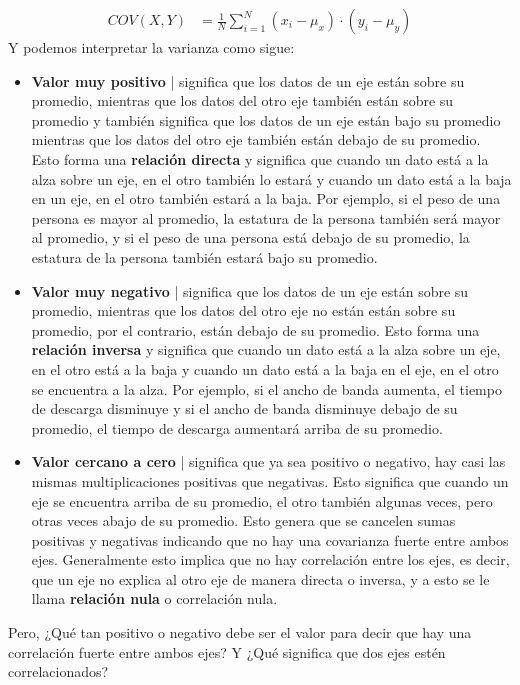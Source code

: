 \documentclass{article}
\begin{document}
\begin{equation}
    \begin{aligned}
        COV(X, Y) &= \frac{1}{N} \sum_{i=1}^{N} (x_i - \mu_x) \cdot (y_i - \mu_y)
    \end{aligned}
\end{equation}
Y podemos interpretar la varianza como sigue:
\begin{itemize}
    \item \textbf{Valor muy positivo} | significa que los datos de un eje están sobre su promedio, mientras que los datos del otro eje también están sobre su promedio y también significa que los datos de un eje están bajo su promedio mientras que los datos del otro eje también están debajo de su promedio. Esto forma una \textbf{relación directa} y significa que cuando un dato está a la alza sobre un eje, en el otro también lo estará y cuando un dato está a la baja en un eje, en el otro también estará a la baja. Por ejemplo, si el peso de una persona es mayor al promedio, la estatura de la persona también será mayor al promedio, y si el peso de una persona está debajo de su promedio, la estatura de la persona también estará bajo su promedio.
    \item \textbf{Valor muy negativo} | significa que los datos de un eje están sobre su promedio, mientras que los datos del otro eje no están están sobre su promedio, por el contrario, están debajo de su promedio. Esto forma una \textbf{relación inversa} y significa que cuando un dato está a la alza sobre un eje, en el otro está a la baja y cuando un dato está a la baja en el eje, en el otro se encuentra a la alza. Por ejemplo, si el ancho de banda aumenta, el tiempo de descarga disminuye y si el ancho de banda disminuye debajo de su promedio, el tiempo de descarga aumentará arriba de su promedio.
    \item \textbf{Valor cercano a cero} | significa que ya sea positivo o negativo, hay casi las mismas multiplicaciones positivas que negativas. Esto significa que cuando un eje se encuentra arriba de su promedio, el otro también algunas veces, pero otras veces abajo de su promedio. Esto genera que se cancelen sumas positivas y negativas indicando que no hay una covarianza fuerte entre ambos ejes. Generalmente esto implica que no hay correlación entre los ejes, es decir, que un eje no explica al otro eje de manera directa o inversa, y a esto se le llama \textbf{relación nula} o correlación nula.
\end{itemize}
Pero, ¿Qué tan positivo o negativo debe ser el valor para decir que hay una correlación fuerte entre ambos ejes? Y ¿Qué significa que dos ejes estén correlacionados?
\end{document}
